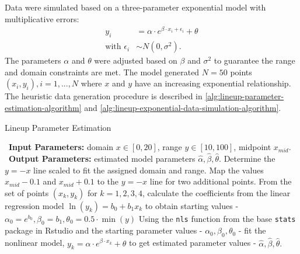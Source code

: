 \documentclass[print]{nuthesis}
\begin{document}
Data were simulated based on a three-parameter exponential model with multiplicative errors:
\begin{align}
y_i & = \alpha\cdot e^{\beta\cdot x_i + \epsilon_i} + \theta \\
\text{with } \epsilon_i & \sim N(0, \sigma^2). \nonumber
\end{align}
The parameters \(\alpha\) and \(\theta\) were adjusted based on \(\beta\) and \(\sigma^2\) to guarantee the range and domain constraints are met.
The model generated \(N = 50\) points \((x_i, y_i), i = 1,...,N\) where \(x\) and \(y\) have an increasing exponential relationship.
The heuristic data generation procedure is described in \cref{alg:lineup-parameter-estimation-algorithm} and \cref{alg:lineup-exponential-data-simulation-algorithm}.

\begin{algorithm}
  \caption{Lineup Parameter Estimation}\label{alg:lineup-parameter-estimation-algorithm}
  \begin{algorithmic}[1]
    \Statex \textbullet~\textbf{Input Parameters:} domain $x\in[0,20]$, range $y\in[10,100]$, midpoint $x_{mid}$.
    \Statex \textbullet~\textbf{Output Parameters:} estimated model parameters $\hat\alpha, \hat\beta, \hat\theta$.
    \State Determine the $y=-x$ line scaled to fit the assigned domain and range.
    \State Map the values $x_{mid} - 0.1$ and $x_{mid} + 0.1$ to the $y=-x$ line for two additional points.
    \State From the set of points $(x_k, y_k)$ for $k = 1,2,3,4$, calculate the coefficients from the linear regression model $\ln(y_k) = b_0 +b_1x_k$ to obtain starting values - $\alpha_0 = e^{b_0}, \beta_0 =  b_1, \theta_0 = 0.5\cdot \min(y)$
    \State Using the \texttt{nls} function from the base \texttt{stats} package in Rstudio and the starting parameter values - $\alpha_0, \beta_0, \theta_0$ - fit the nonlinear model, $y_k = \alpha\cdot e^{\beta\cdot x_k}+\theta$ to get estimated parameter values - $\hat\alpha, \hat\beta, \hat\theta.$
  \end{algorithmic}
\end{algorithm}
\end{document}
